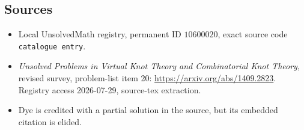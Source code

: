 \documentclass[11pt]{article}
\begin{document}
\subsection{Sources}
\begin{itemize}
\item Local UnsolvedMath registry, permanent ID \(10600020\), exact source code \texttt{catalogue entry}.
\item \emph{Unsolved Problems in Virtual Knot Theory and Combinatorial Knot Theory}, revised survey, problem-list item 20: \url{https://arxiv.org/abs/1409.2823}. Registry access 2026-07-29, source-tex extraction.
\item Dye is credited with a partial solution in the source, but its embedded citation is elided.
\end{itemize}
\end{document}
